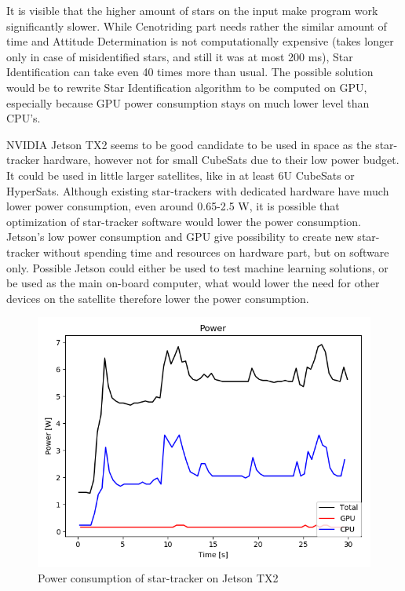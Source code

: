 \documentclass[12pt,a4paper,twoside]{article}
\begin{document}
It is visible that the higher amount of stars on the input make program work significantly slower. While Cenotriding part needs rather the similar amount of time and Attitude Determination is not computationally expensive (takes longer only in case of misidentified stars, and still it was at most 200 ms), Star Identification can take even 40 times more than usual. The possible solution would be to rewrite Star Identification algorithm to be computed on GPU, especially because GPU power consumption stays on much lower level than CPU's.

NVIDIA Jetson TX2 seems to be good candidate to be used in space as the star-tracker hardware, however not for small CubeSats due to their low power budget. It could be used in little larger satellites, like in at least 6U CubeSats or HyperSats. Although existing star-trackers with dedicated hardware have much lower power consumption, even around 0.65-2.5 W, it is possible that optimization of star-tracker software would lower the power consumption. Jetson's low power consumption and GPU give possibility to create new star-tracker without spending time and resources on hardware part, but on software only. Possible Jetson could either be used to test machine learning solutions, or be used as the main on-board computer, what would lower the need for other devices on the satellite therefore lower the power consumption.

\begin{figure}[!htbp]
\includegraphics[scale=0.55]{power_plot.png}
\centering
\caption[Power consumption of star-tracker on Jetson TX2]{Power consumption of star-tracker on Jetson TX2}
\label{fig:power_plot}
\end{figure}
\end{document}
